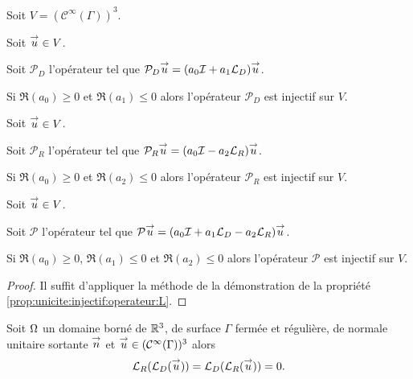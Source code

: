   Soit \(V=(\mathcal{C}^\infty(\Gamma))^3\).
  \begin{prop}
    \label{prop:unicite:injectif:operateur:LD}
    Soit \({\overset{\rightarrow}{u}} \in V\).

    Soit \(\mathcal{P}_D\) l'opérateur tel que \(\mathcal{P}_D{\overset{\rightarrow}{u}} = (a_0{\mathcal{I}} + a_1 {\mathcal{L}_D}){\overset{\rightarrow}{u}}\).

    Si \(\Re(a_0)\ge 0\) et \(\Re(a_1)\le 0\) alors l'opérateur \(\mathcal{P}_D\) est injectif sur \(V\).
  \end{prop}
  \begin{prop}
    \label{prop:unicite:injectif:operateur:LR}
    Soit \({\overset{\rightarrow}{u}} \in V\).

    Soit \(\mathcal{P}_R\) l'opérateur tel que \(\mathcal{P}_R{\overset{\rightarrow}{u}} = (a_0{\mathcal{I}} - a_2 {\mathcal{L}_R}){\overset{\rightarrow}{u}}\).

    Si \(\Re(a_0)\ge 0\) et \(\Re(a_2)\le 0\) alors l'opérateur \(\mathcal{P}_R\) est injectif sur \(V\).
  \end{prop}
  \begin{prop}
    \label{prop:unicite:injectif:operateur:LD-LR}
    Soit \({\overset{\rightarrow}{u}} \in V\).
    
    Soit \(\mathcal{P}\) l'opérateur tel que \(\mathcal{P}{\overset{\rightarrow}{u}} = (a_0{\mathcal{I}} + a_1 {\mathcal{L}_D} - a_2{\mathcal{L}_R}){\overset{\rightarrow}{u}}\).

    Si \(\Re(a_0)\ge 0\), \(\Re(a_1)\le 0\) et \(\Re(a_2)\le 0\) alors l'opérateur \(\mathcal{P}\) est injectif sur \(V\).
  \end{prop}
  \begin{proof}
    Il suffit d'appliquer la méthode de la démonstration de la propriété \ref{prop:unicite:injectif:operateur:L}.
  \end{proof}

  \begin{prop}
    Soit \(\Omega\) un domaine borné de \(\mathbb R^3\), de surface \(\Gamma\) fermée et régulière, de normale unitaire sortante \({\overset{\rightarrow}{n}}\) et \({\overset{\rightarrow}{u}} \in (\mathcal{C}^\infty(\Gamma))^3\) alors
    \begin{equation*}
        {\mathcal{L}_R}({\mathcal{L}_D}({\overset{\rightarrow}{u}})) = {\mathcal{L}_D}({\mathcal{L}_R}({\overset{\rightarrow}{u}})) = 0.
    \end{equation*}
  \end{prop}

